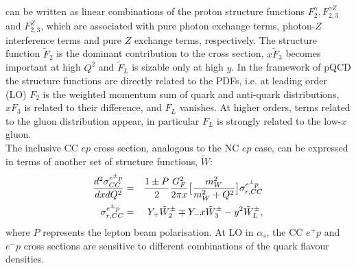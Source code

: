can be written as linear combinations of the proton structure functions $F^{\gamma}_2, F^{\gamma Z}_{2,3}$ 
and $F^Z_{2,3}$, which are associated with pure photon exchange terms, photon-$Z$ interference
terms and pure $Z$ exchange terms, respectively. 
The structure function $\tilde F_2$ is the dominant contribution to the cross section, 
$x \tilde F_3$ becomes important at high $Q^2$ and $\tilde F_L$ is sizable 
only at high $y$. 
In the framework of pQCD the structure functions are directly related to the 
PDFs, i.e. at leading order (LO)  $F_2$ is the weighted momentum sum of quark and anti-quark distributions, 
 $xF_3$ is related to their difference, 
and $F_L$ vanishes. At higher orders, terms related to the gluon distribution
appear, in particular $F_L$ is strongly related to the low-$x$ 
gluon.
\\
The inclusive CC $ep$ cross section, analogous to the NC $ep$ case, can be expressed in terms of another set 
of structure functions, $\tilde W$: 
\begin{eqnarray}
\centering
   \frac{d^2\sigma_{CC}^{e^{\pm} p}}{dxdQ^2}&=&\frac{1\pm P}{2}\frac{G^2_F}{2\pi x}\big [\frac{m^2_W}{m^2_W+Q^2}\big ]\sigma_{r,CC}^{e^{\pm} p}\\
   \sigma_{r,CC}^{e^{\pm} p}&= &  Y_{+} \tilde W_2^{\pm} \mp Y_{-}x \tilde W_3^{\pm} - y^2 \tilde W_L^{\pm},
\end{eqnarray}
where $P$ represents the lepton beam polarisation.
At LO in $\alpha_s$, the CC $e^+p$ and $e^-p$ cross sections are sensitive to 
different combinations of the quark flavour densities.

